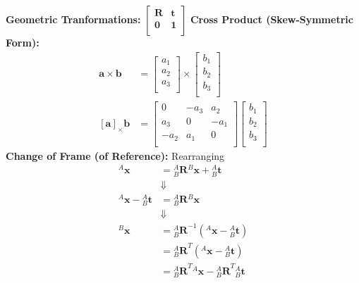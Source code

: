 \documentclass[a4paper,10pt]{article}
\newcommand{\mRTzeroone}{\ensuremath{\left[\begin{array}{c|c}\mathbf{R}&\mathbf{t}\\\hline\mathbf{0}&\mathbf{1}\\\end{array}\right]}}
\newcommand{\spnhx}[1]{\ensuremath{{^{#1}}\mathbf{{x}}}}
\newcommand{\spppnhx}[3]{\ensuremath{{^{#1}_{#2}}\mathbf{{{#3}}}}}
\begin{document}
\noindent\textbf{Geometric Tranformations:}
\newline\noindent\newline\noindent
\mRTzeroone
\newline\noindent\newline\noindent
\textbf{Cross Product (Skew-Symmetric Form):}
\newline\noindent\newline\noindent
\begin{equation*}
\begin{split}
\mathbf{a}\times\mathbf{b} &= 
\left[\begin{array}{c}a_{1}\\a_{2}\\a_{3}\\\end{array}\right]
\times
\left[\begin{array}{c}b_{1}\\b_{2}\\b_{3}\\\end{array}\right]
\\       
{[\mathbf{a}]}_{\times}{\mathbf{b}}
&=
\left[\begin{array}{rrr}
0 & -a_{3} & a_{2}\\
a_{3} & 0 & -a_{1}\\
-a_{2} & a_{1} & 0\\
      \end{array}\right]
\left[\begin{array}{c}b_{1}\\b_{2}\\b_{3}\\\end{array}\right]      
\end{split}
\end{equation*}
\newline\noindent
\textbf{Change of Frame (of Reference):}
\newline\noindent
Rearranging
\begin{equation*}
\begin{split}
\spnhx{A} &= \spppnhx{A}{B}{R}\spnhx{B} + \spppnhx{A}{B}{t}\\
&\Downarrow\\
\spnhx{A} - \spppnhx{A}{B}{t} &= \spppnhx{A}{B}{R}\spnhx{B}\\
&\Downarrow\\
\spnhx{B} &= {\spppnhx{A}{B}{R}}^{-1}\left(\spnhx{A} - \spppnhx{A}{B}{t}\right)\\
&= {\spppnhx{A}{B}{R}}^{T}\left(\spnhx{A} - \spppnhx{A}{B}{t}\right)\\
&= {\spppnhx{A}{B}{R}}^{T}\spnhx{A} - {\spppnhx{A}{B}{R}}^{T}\spppnhx{A}{B}{t}\\
\end{split}
\end{equation*}
\end{document}
